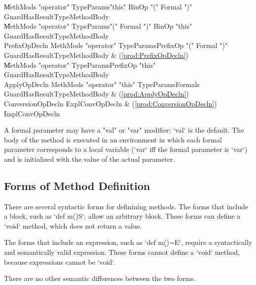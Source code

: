 \begin{bbgrammar}
                     \| MethMods \xcd"operator" TypeParams\opt \xcd"this" BinOp \xcd"(" Formal  \xcd")" Guard\opt HasResultType\opt MethodBody \\
                     \| MethMods \xcd"operator" TypeParams\opt \xcd"(" Formal  \xcd")" BinOp \xcd"this" Guard\opt HasResultType\opt MethodBody \\
       PrefixOpDecln \: MethMods \xcd"operator" TypeParams\opt PrefixOp \xcd"(" Formal  \xcd")" Guard\opt HasResultType\opt MethodBody & (\ref{prod:PrefixOpDecln}) \\
                     \| MethMods \xcd"operator" TypeParams\opt PrefixOp \xcd"this" Guard\opt HasResultType\opt MethodBody \\
        ApplyOpDecln \: MethMods \xcd"operator" \xcd"this" TypeParams\opt Formals Guard\opt HasResultType\opt MethodBody & (\ref{prod:ApplyOpDecln}) \\
   ConversionOpDecln \: ExplConvOpDecln & (\ref{prod:ConversionOpDecln}) \\
                     \| ImplConvOpDecln \\
\end{bbgrammar}


A formal parameter may have a \xcd"val" or \xcd"var"
modifier; \xcd`val` is the default.
The body of the method is executed in an environment in which 
each formal parameter corresponds to a local variable (\xcd`var` iff the
formal parameter is \xcd`var`)
and is initialized with the value of the actual parameter.

\subsection{Forms of Method Definition}

There are several syntactic forms for definining methods.   The forms that
include a block, such as \xcd`def m(){S}`, allow an arbitrary block.  These
forms can define a \xcd`void` method, which does not return a value. 

The
forms that include an expression, such as \xcd`def m()=E`, require a
syntactically and semantically valid expression.   These forms cannot define a
\xcd`void` method, because expressions cannot be \xcd`void`.  

There are no other semantic differences between the two forms. 


